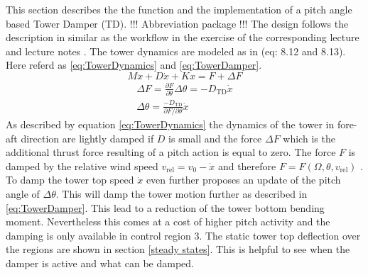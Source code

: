 This section describes the the function and the implementation of a pitch angle based Tower Damper (TD). !!! Abbreviation package !!! The design follows the description in \cite{WindEnergyHandbook} similar as the workflow in the exercise of the corresponding lecture and lecture notes \cite{2024}. The tower dynamics are modeled as in \cite{WindEnergyHandbook} (eq: 8.12 and 8.13). Here referd as \ref{eq:TowerDynamics} and \ref{eq:TowerDamper}.
\begin{equation}
	M\ddot{x} + D\dot{x} + Kx = F + \Delta F
	\label{eq:TowerDynamics}
\end{equation}
\begin{equation}
	\begin{aligned}
		\Delta F = \frac{\partial F}{\partial \theta}\Delta\theta = -D_{\text{TD}}\dot{x}\\
		\Delta\theta = \frac{-D_{\text{TD}}}{\partial F/\partial \theta}\dot{x}
	\end{aligned}
	\label{eq:TowerDamper}
\end{equation}
As described by equation \ref{eq:TowerDynamics} the dynamics of the tower in fore-aft direction are lightly damped if $D$ is small and the force $\Delta F$ which is the additional thrust force resulting of a pitch action is equal to zero. The force $F$ is damped by the relative wind speed $v_{\text{rel}} = v_0 - \dot{x}$ and therefore $F = F(\Omega, \theta, v_{\text{rel}})$ \cite{2024}. To damp the tower top speed $\dot{x}$ even further \cite{WindEnergyHandbook} proposes an update of the pitch angle of $\Delta\theta$. This will damp the tower motion further as described in \ref{eq:TowerDamper}. This lead to a reduction of the tower bottom bending moment. Nevertheless this comes at a cost of higher pitch activity and the damping is only available in control region 3. The static tower top deflection over the regions are shown in section \ref{steady states}. This is helpful to see when the damper is active and what can be damped. 

